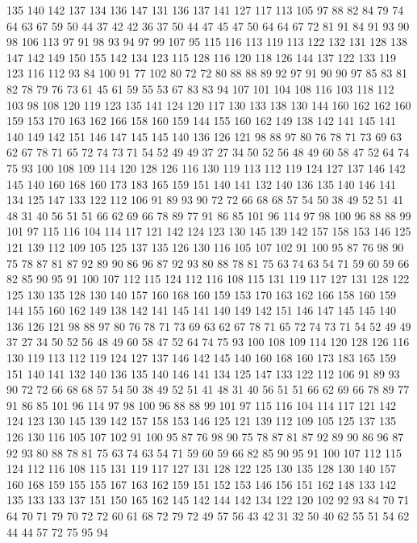 135 140 142 137 134 136 147 131 136 137 141 127 117 113 105 97 88 82 84 79
74 64 63 67 59 50 44 37 42 42 36 37 50 44 47 45 47 50 64 64
67 72 81 91 84 91 93 90 98 106 113 97 91 98 93 94 97 99 107 95
115 116 113 119 113 122 132 131 128 138 147 142 149 150 155 142 134 123 115 128
116 120 118 126 144 137 122 133 119 123 116 112 93 84 100 91 77 102 80 72
72 80 88 88 89 92 97 91 90 90 97 85 83 81 82 78 79 76 73 61
45 61 59 55 53 67 83 83 94 107 101 104 108 116 103 118 112 103 98 108
120 119 123 135 141 124 120 117 130 133 138 130 144 160 162 162 160 159 153 170
163 162 166 158 160 159 144 155 160 162 149 138 142 141 145 141 140 149 142 151
146 147 145 145 140 136 126 121 98 88 97 80 76 78 71 73 69 63 62 67
78 71 65 72 74 73 71 54 52 49 49 37 27 34 50 52 56 48 49 60
58 47 52 64 74 75 93 100 108 109 114 120 128 126 116 130 119 113 112 119
124 127 137 146 142 145 140 160 168 160 173 183 165 159 151 140 141 132 140 136
135 140 146 141 134 125 147 133 122 112 106 91 89 93 90 72 72 66 68 68
57 54 50 38 49 52 51 41 48 31 40 56 51 51 66 62 69 66 78 89
77 91 86 85 101 96 114 97 98 100 96 88 88 99 101 97 115 116 104 114
117 121 142 124 123 130 145 139 142 157 158 153 146 125 121 139 112 109 105 125
137 135 126 130 116 105 107 102 91 100 95 87 76 98 90 75 78 87 81 87
92 89 90 86 96 87 92 93 80 88 78 81 75 63 74 63 54 71 59 60
59 66 82 85 90 95 91 100 107 112 115 124 112 116 108 115 131 119 117 127
131 128 122 125 130 135 128 130 140 157 160 168 160 159 153 170 163 162 166 158
160 159 144 155 160 162 149 138 142 141 145 141 140 149 142 151 146 147 145 145
140 136 126 121 98 88 97 80 76 78 71 73 69 63 62 67 78 71 65 72
74 73 71 54 52 49 49 37 27 34 50 52 56 48 49 60 58 47 52 64
74 75 93 100 108 109 114 120 128 126 116 130 119 113 112 119 124 127 137 146
142 145 140 160 168 160 173 183 165 159 151 140 141 132 140 136 135 140 146 141
134 125 147 133 122 112 106 91 89 93 90 72 72 66 68 68 57 54 50 38
49 52 51 41 48 31 40 56 51 51 66 62 69 66 78 89 77 91 86 85
101 96 114 97 98 100 96 88 88 99 101 97 115 116 104 114 117 121 142 124
123 130 145 139 142 157 158 153 146 125 121 139 112 109 105 125 137 135 126 130
116 105 107 102 91 100 95 87 76 98 90 75 78 87 81 87 92 89 90 86
96 87 92 93 80 88 78 81 75 63 74 63 54 71 59 60 59 66 82 85
90 95 91 100 107 112 115 124 112 116 108 115 131 119 117 127 131 128 122 125
130 135 128 130 140 157 160 168 159 155 155 167 163 162 159 151 152 153 146 156
151 162 148 133 142 135 133 133 137 151 150 165 162 145 142 144 142 134 122 120
102 92 93 84 70 71 64 70 71 79 70 72 72 60 61 68 72 79 72 49
57 56 43 42 31 32 50 40 62 55 51 54 62 44 44 57 72 75 95 94
